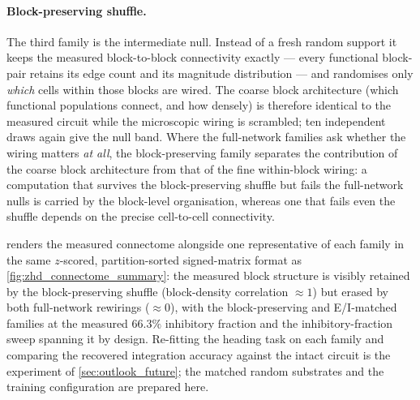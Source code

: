 \documentclass[11pt]{article}
\begin{document}
\paragraph{Block-preserving shuffle.} The third family is the intermediate null.
Instead of a fresh random support it keeps the measured block-to-block
connectivity exactly --- every functional block-pair retains its edge count and
its magnitude distribution --- and randomises only \emph{which} cells within
those blocks are wired. The coarse block architecture (which functional
populations connect, and how densely) is therefore identical to the measured
circuit while the microscopic wiring is scrambled; ten independent draws again
give the null band. Where the full-network families ask whether the wiring
matters \emph{at all}, the block-preserving family separates the contribution of
the coarse block architecture from that of the fine within-block wiring: a
computation that survives the block-preserving shuffle but fails the
full-network nulls is carried by the block-level organisation, whereas one that
fails even the shuffle depends on the precise cell-to-cell connectivity.

 renders the measured connectome alongside one
representative of each family in the same $z$-scored, partition-sorted
signed-matrix format as \cref{fig:zhd_connectome_summary}: the measured block
structure is visibly retained by the block-preserving shuffle (block-density
correlation $\approx1$) but erased by both full-network rewirings ($\approx0$),
with the block-preserving and E/I-matched families at the measured $66.3\%$
inhibitory fraction and the inhibitory-fraction sweep spanning it by design.
Re-fitting the heading task on each family and
comparing the recovered integration accuracy against the intact circuit is the
experiment of \cref{sec:outlook_future}; the matched random substrates and the
training configuration are prepared here.
\end{document}
